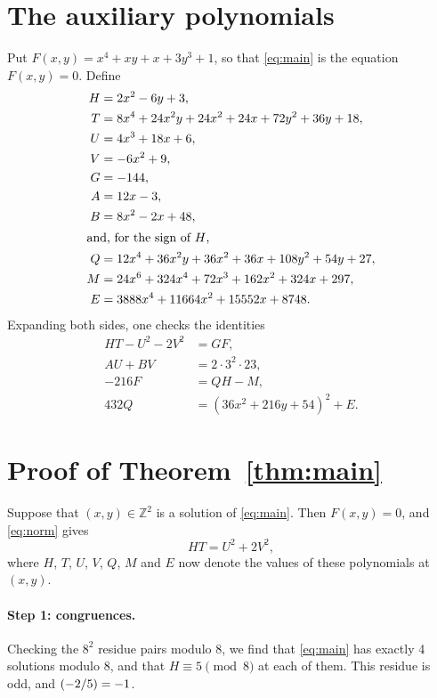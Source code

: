 \documentclass[11pt]{article}
\newcommand{\Z}{\mathbb{Z}}
\newcommand{\leg}[2]{\mathchoice{\biggl(\dfrac{#1}{#2}\biggr)}{(#1/#2)}{(#1/#2)}{(#1/#2)}}
\begin{document}
\section{The auxiliary polynomials}

Put $F(x,y)=x^{4}+xy+x+3y^{3}+1$, so that \eqref{eq:main} is the equation $F(x,y)=0$. Define
\begin{align*}
H&=2x^{2}-6y+3,\\
T&=8x^{4}+24x^{2}y+24x^{2}+24x+72y^{2}+36y+18,\\
U&=4x^{3}+18x+6,\\
V&=-6x^{2}+9,\\
G&=-144,\\
A&=12x-3,\\
B&=8x^{2}-2x+48,\\
\intertext{and, for the sign of $H$,}
Q&=12x^{4}+36x^{2}y+36x^{2}+36x+108y^{2}+54y+27,\\
M&=24x^{6}+324x^{4}+72x^{3}+162x^{2}+324x+297,\\
E&=3888x^{4}+11664x^{2}+15552x+8748.
\end{align*}
Expanding both sides, one checks the identities
\begin{align}
HT-U^2-2V^2&=GF,\label{eq:norm}\\
AU+BV&=2\cdot 3^{2}\cdot 23,\label{eq:bezout}\\
-216F&=QH-M,\label{eq:sign}\\
432Q&=(36x^{2}+216y+54)^2+E.\label{eq:sign2}
\end{align}

\section{Proof of Theorem~\ref{thm:main}}

Suppose that $(x,y)\in\Z^2$ is a solution of \eqref{eq:main}. Then $F(x,y)=0$, and \eqref{eq:norm} gives
\begin{equation}\label{eq:HT}
HT=U^2+2V^2,
\end{equation}
where $H$, $T$, $U$, $V$, $Q$, $M$ and $E$ now denote the values of these polynomials at $(x,y)$.

\paragraph{Step 1: congruences.} Checking the $8^2$ residue pairs modulo $8$, we find that \eqref{eq:main} has exactly 4 solutions modulo $8$, and that $H\equiv5\pmod{8}$ at each of them. This residue is odd, and $\leg{-2}{5}=-1$.
\end{document}

